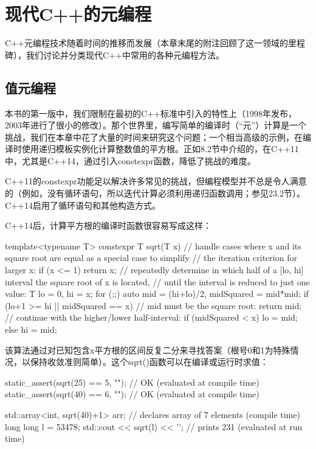 \section{现代C++的元编程}

C++元编程技术随着时间的推移而发展（本章末尾的附注回顾了这一领域的里程碑），我们讨论并分类现代C++中常用的各种元编程方法。

\subsection{值元编程}

本书的第一版中，我们限制在最初的C++标准中引入的特性上（1998年发布，2003年进行了很小的修改）。那个世界里，编写简单的编译时（“元”）计算是一个挑战，我们在本章中花了大量的时间来研究这个问题；一个相当高级的示例，在编译时使用递归模板实例化计算整数值的平方根。正如8.2节中介绍的，在C++11中，尤其是C++14，通过引入constexpr函数，降低了挑战的难度。

\begin{notice}
C++11的constexpr功能足以解决许多常见的挑战，但编程模型并不总是令人满意的（例如，没有循环语句，所以迭代计算必须利用递归函数调用；参见23.2节）。C++14启用了循环语句和其他构造方式。
\end{notice}

C++14后，计算平方根的编译时函数很容易写成这样：

\begin{cpp}
template<typename T>
constexpr T sqrt(T x)
{
	// handle cases where x and its square root are equal as a special case to simplify
	// the iteration criterion for larger x:
	if (x <= 1) {
		return x;
	}
	// repeatedly determine in which half of a [lo, hi] interval the square root of x is located,
	// until the interval is reduced to just one value:
	T lo = 0, hi = x;
	for (;;) {
		auto mid = (hi+lo)/2, midSquared = mid*mid;
		if (lo+1 >= hi || midSquared == x) {
			// mid must be the square root:
			return mid;
		}
		// continue with the higher/lower half-interval:
		if (midSquared < x) {
			lo = mid;
		}
		else {
			hi = mid;
		}
	}
}
\end{cpp}

该算法通过对已知包含x平方根的区间反复二分来寻找答案（根号0和1为特殊情况，以保持收敛准则简单）。这个sqrt()函数可以在编译或运行时求值：

\begin{cpp}
static_assert(sqrt(25) == 5, ""); // OK (evaluated at compile time)
static_assert(sqrt(40) == 6, ""); // OK (evaluated at compile time)

std::array<int, sqrt(40)+1> arr; // declares array of 7 elements (compile time)
long long l = 53478;
std::cout << sqrt(l) << '\n'; // prints 231 (evaluated at run time)
\end{cpp}

